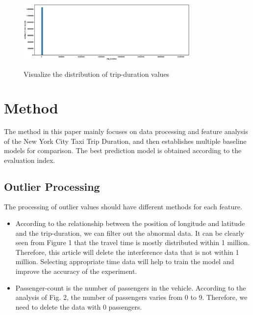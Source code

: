 \begin{figure}
  \centering
   \includegraphics[width=0.8\textwidth]{figure//fig-1.eps}\\
  \caption{Visualize the distribution of trip-duration values}\label{fig:demical1}
\end{figure}



\section{Method} \label{sec-method}


The method in this paper mainly focuses on data processing and feature analysis of the New York City Taxi Trip Duration, and then establishes multiple baseline models for comparison. The best prediction model is obtained according to the evaluation index.

\subsection{Outlier Processing}
The processing of outlier values should have different methods for each feature.
\begin{itemize}
    \item  
  According to the relationship between the position of longitude and latitude and the trip-duration, we can filter out the abnormal data. It can be clearly seen from Figure 1 that the travel time is mostly distributed within 1 million. Therefore, this article will delete the interference data that is not within 1 million. Selecting appropriate time data will help to train the model and improve the accuracy of the experiment.
   \item
  Passenger-count is the number of passengers in the vehicle. According to the analysis of Fig. 2, the number of passengers varies from 0 to 9. Therefore, we need to delete the data with 0 passengers.
  \end{itemize}
  
